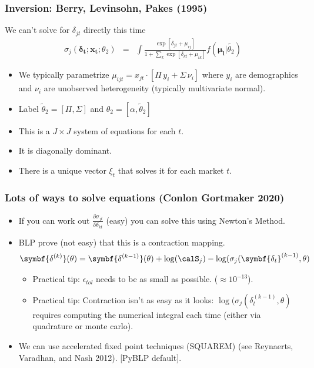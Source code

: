 \begin{frame}
\frametitle{Inversion: Berry, Levinsohn, Pakes (1995)}
We can't solve for $\delta_{jt}$ directly this time
\begin{eqnarray*}
\sigma_j(\symbf{\delta_t}; \symbf{x_t}; \theta_2) &=& \int \frac{\exp[\delta_{jt} +  \mu_{ij} ]}{1+\sum_k \exp[\delta_{kt} + \mu_{ik} ]} f(\symbf{\mu_i}| \widetilde{\theta_2})
\end{eqnarray*}
 \begin{itemize}
    \item We typically parametrize $\mu_{ijt} = x_{jt} \cdot [\Pi \, y_i + \Sigma \, \nu_{i}]$ where $y_i$ are demographics and $\nu_i$ are unobserved heterogeneity (typically multivariate normal).
    \item Label $\widetilde{\theta}_2 = [\Pi, \Sigma]$ and $\theta_2 =[\alpha, \widetilde{\theta}_2 ]$
 \item This is a $J \times J$ system of equations for each $t$.
 \item It is diagonally dominant.
 \item There is a unique vector $\xi_t$ that solves it for each market $t$.
 \end{itemize}
\end{frame}

\begin{frame}
\frametitle{Lots of ways to solve equations (Conlon Gortmaker 2020)}
 \begin{itemize}
     \item If you can work out $\frac{\partial \sigma_{jt}}{\partial \delta_{kt}}$ (easy) you can solve this using Newton's Method. 
 \item BLP prove (not easy) that this is a \alert{contraction mapping}.
\begin{eqnarray*}
    \symbf{\delta^{(k)}}(\theta) = \symbf{\delta^{(k-1)}}(\theta) + \log(\calS_{j}) - \log(\sigma_{j}(\symbf{\delta_t}^{(k-1)}, \theta)
\end{eqnarray*}

\begin{itemize} 
  \item Practical tip: $\epsilon_{tol}$ needs to be as small as possible. ($\approx 10^{-13}$).
 \item Practical tip: Contraction isn't as easy as it looks:  $ \log(\sigma_{j}(\delta_t^{(k-1)}, \theta)$ requires computing the numerical integral each time (either via quadrature or monte carlo).
\end{itemize}
\item We can use \alert{accelerated fixed point} techniques (SQUAREM) (see Reynaerts, Varadhan, and Nash 2012). [PyBLP default].
  \end{itemize}
 \end{frame}



